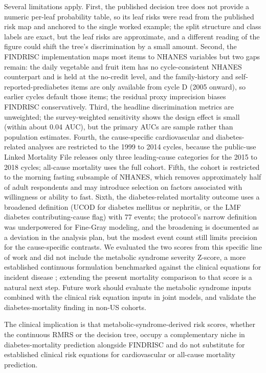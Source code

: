 \documentclass[11pt]{article}
\begin{document}
Several limitations apply. First, the published decision tree does not provide a numeric per-leaf probability table, so its leaf risks were read from the published risk map and anchored to the single worked example; the split structure and class labels are exact, but the leaf risks are approximate, and a different reading of the figure could shift the tree's discrimination by a small amount. Second, the FINDRISC implementation maps most items to NHANES variables but two gaps remain: the daily vegetable and fruit item has no cycle-consistent NHANES counterpart and is held at the no-credit level, and the family-history and self-reported-prediabetes items are only available from cycle D (2005 onward), so earlier cycles default those items; the residual proxy imprecision biases FINDRISC conservatively. Third, the headline discrimination metrics are unweighted; the survey-weighted sensitivity shows the design effect is small (within about 0.04 AUC), but the primary AUCs are sample rather than population estimates. Fourth, the cause-specific cardiovascular and diabetes-related analyses are restricted to the 1999 to 2014 cycles, because the public-use Linked Mortality File releases only three leading-cause categories for the 2015 to 2018 cycles; all-cause mortality uses the full cohort. Fifth, the cohort is restricted to the morning fasting subsample of NHANES, which removes approximately half of adult respondents and may introduce selection on factors associated with willingness or ability to fast. Sixth, the diabetes-related mortality outcome uses a broadened definition (UCOD for diabetes mellitus or nephritis, or the LMF diabetes contributing-cause flag) with 77 events; the protocol's narrow definition was underpowered for Fine-Gray modeling, and the broadening is documented as a deviation in the analysis plan, but the modest event count still limits precision for the cause-specific contrasts. We evaluated the two scores from this specific line of work and did not include the metabolic syndrome severity Z-score, a more established continuous formulation benchmarked against the clinical equations for incident disease \citep{guo2018metsz, gurka2018metsz}; extending the present mortality comparison to that score is a natural next step. Future work should evaluate the metabolic syndrome inputs combined with the clinical risk equation inputs in joint models, and validate the diabetes-mortality finding in non-US cohorts.

The clinical implication is that metabolic-syndrome-derived risk scores, whether the continuous RMRS or the decision tree, occupy a complementary niche in diabetes-mortality prediction alongside FINDRISC and do not substitute for established clinical risk equations for cardiovascular or all-cause mortality prediction.
\end{document}
